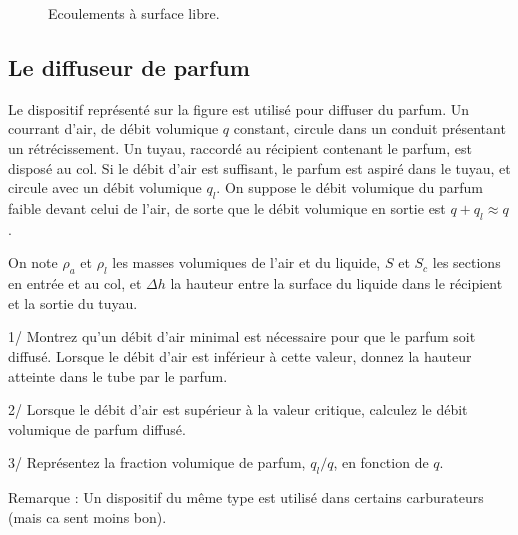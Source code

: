 {\begin{figure}[hbt]
\begin{center}
\end{center}
\caption{Ecoulements \`a surface libre.}
\label{fig:esl}
\end{figure}


\newpage
\subsection{Le diffuseur de parfum }


%


Le dispositif représenté sur la figure est utilisé pour diffuser du parfum.
Un courrant d'air, de débit volumique $q$ constant, circule dans un conduit
présentant un rétrécissement. Un tuyau, raccordé au récipient contenant le 
parfum, est disposé au col. Si le débit d'air est suffisant, le parfum
est aspiré dans le tuyau, et circule avec un débit volumique $q_l$.
On suppose le débit volumique du parfum faible devant celui de l'air,
de sorte que le débit volumique en sortie est $q+q_l \approx q$.

On note $\rho_a$ et $\rho_l$ les masses volumiques de l'air et du liquide,
$S$ et $S_c$ les sections en entrée et au col, et $\Delta h$ la hauteur entre
la surface du liquide dans le récipient et la sortie du tuyau.

1/ Montrez qu'un débit d'air minimal est nécessaire pour que le parfum
soit diffusé.
Lorsque le débit d'air est inférieur à cette valeur, donnez la hauteur atteinte
dans le tube par le parfum.

2/ Lorsque le débit d'air est supérieur à la valeur critique, calculez
le débit volumique de parfum diffusé.

3/ Représentez la fraction volumique de parfum, $q_l/q$, en fonction de $q$.



Remarque : Un dispositif du même type est utilisé dans certains carburateurs
(mais ca sent moins bon).

}
